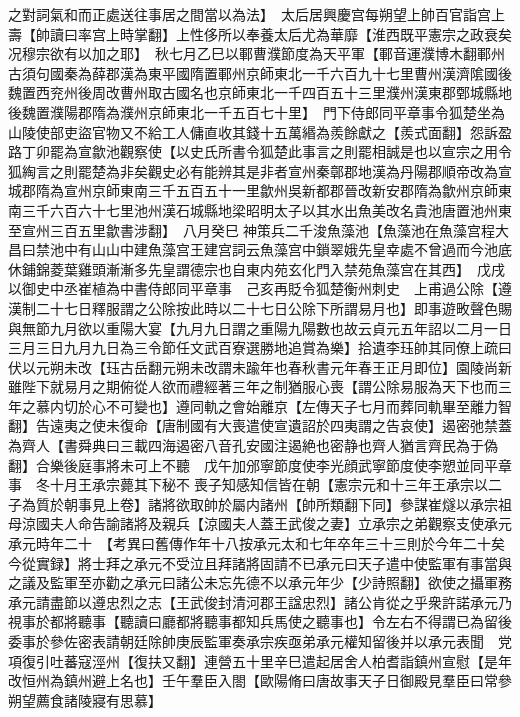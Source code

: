 之對詞氣和而正處送往事居之間當以為法】　太后居興慶宫每朔望上帥百官詣宫上壽【帥讀曰率宫上時掌翻】上性侈所以奉養太后尤為華靡【淮西既平憲宗之政衰矣况穆宗欲有以加之耶】　秋七月乙巳以鄆曹濮節度為天平軍【鄆音運濮博木翻鄆州古須句國秦為薛郡漢為東平國隋置鄆州京師東北一千六百九十七里曹州漢濟隂國後魏置西兖州後周改曹州取古國名也京師東北一千四百五十三里濮州漢東郡鄄城縣地後魏置濮陽郡隋為濮州京師東北一千五百七十里】　門下侍郎同平章事令狐楚坐為山陵使部吏盜官物又不給工人傭直收其錢十五萬緡為羨餘獻之【羨式面翻】怨訴盈路丁卯罷為宣歙池觀察使【以史氏所書令狐楚此事言之則罷相誠是也以宣宗之用令狐綯言之則罷楚為非矣觀史必有能辨其是非者宣州秦鄣郡地漢為丹陽郡順帝改為宣城郡隋為宣州京師東南三千五百五十一里歙州吳新都郡晉改新安郡隋為歙州京師東南三千六百六十七里池州漢石城縣地梁昭明太子以其水出魚美改名貴池唐置池州東至宣州三百五里歙書涉翻】　八月癸巳神策兵二千浚魚藻池【魚藻池在魚藻宫程大昌曰禁池中有山山中建魚藻宫王建宫詞云魚藻宫中鎖翠娥先皇幸處不曾過而今池底休鋪錦菱葉雞頭漸漸多先皇謂德宗也自東内苑玄化門入禁苑魚藻宫在其西】　戊戌以御史中丞崔植為中書侍郎同平章事　己亥再貶令狐楚衡州刺史　上甫過公除【遵漢制二十七日釋服謂之公除按此時以二十七日公除下所謂易月也】即事遊畋聲色賜與無節九月欲以重陽大宴【九月九日謂之重陽九陽數也故云貞元五年詔以二月一日三月三日九月九日為三令節任文武百寮選勝地追賞為樂】拾遺李珏帥其同僚上疏曰伏以元朔未改【珏古岳翻元朔未改謂未踰年也春秋書元年春王正月即位】園陵尚新雖陛下就易月之期俯從人欲而禮經著三年之制猶服心喪【謂公除易服為天下也而三年之慕内切於心不可變也】遵同軌之會始離京【左傳天子七月而葬同軌畢至離力智翻】告遠夷之使未復命【唐制國有大喪遣使宣遺詔於四夷謂之告哀使】遏密弛禁蓋為齊人【書舜典曰三載四海遏密八音孔安國注遏絶也密静也齊人猶言齊民為于偽翻】合樂後庭事將未可上不聽　戊午加邠寧節度使李光顔武寧節度使李愬並同平章事　冬十月王承宗薨其下秘不喪子知感知信皆在朝【憲宗元和十三年王承宗以二子為質於朝事見上卷】諸將欲取帥於屬内諸州【帥所類翻下同】參謀崔燧以承宗祖母涼國夫人命告諭諸將及親兵【涼國夫人蓋王武俊之妻】立承宗之弟觀察支使承元承元時年二十　【考異曰舊傳作年十八按承元太和七年卒年三十三則於今年二十矣今從實録】將士拜之承元不受泣且拜諸將固請不已承元曰天子遣中使監軍有事當與之議及監軍至亦勸之承元曰諸公未忘先德不以承元年少【少詩照翻】欲使之攝軍務承元請盡節以遵忠烈之志【王武俊封清河郡王諡忠烈】諸公肯從之乎衆許諾承元乃視事於都將聽事【聽讀曰廳都將聽事都知兵馬使之聽事也】令左右不得謂已為留後委事於參佐密表請朝廷除帥庚辰監軍奏承宗疾亟弟承元權知留後并以承元表聞　党項復引吐蕃寇涇州【復扶又翻】連營五十里辛巳遣起居舍人柏耆詣鎮州宣慰【是年改恒州為鎮州避上名也】壬午羣臣入閤【歐陽脩曰唐故事天子日御殿見羣臣曰常參朔望薦食諸陵寢有思慕】

